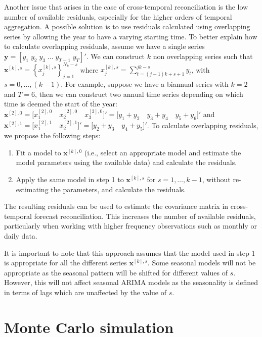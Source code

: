 \documentclass[12pt]{article}
\newcommand{\xvet}{\bm{x}}
\newcommand{\yvet}{\bm{y}}
\theoremstyle{definition}
\begin{document}
Another issue that arises in the case of cross-temporal reconciliation is the low number of available residuals, especially for the higher orders of temporal aggregation. A possible solution is to use residuals calculated using overlapping series by allowing the year to have a varying starting time. To better explain how to calculate overlapping residuals, assume we have a single series $\yvet = [y_1 \; y_2 \; y_3 \; \dots\; y_{T-1}\; y_{T}]'$. We can construct $k$ non overlapping series such that $\xvet^{[k], s} = \left\{x^{[k],s}_{j}\right\}_{j = 1}^{N_k-s}$ where $x^{[k],s}_{j} = \displaystyle\sum_{t = (j-1)k+s+1}^{jk-s} y_t$, with $s = 0, \dots, (k-1)$. For example, suppose we have a biannual series with $k = 2$ and $T = 6$, then we can construct two annual time series depending on which time is deemed the start of the year: $\xvet^{[2], 0} =  \Big[x_1^{[2], 0}\quad x_2^{[2], 0}\quad x_{3}^{[2], 0} \Big]' =\Big[y_1 + y_2\quad y_3 + y_4\quad y_5 + y_6\Big]'$ and $\xvet^{[2], 1} = \Big[x_1^{[2], 1}\quad x_2^{[2], 1} \Big]' = \Big[y_2 + y_3\quad  y_4 + y_5 \Big]'$. To calculate overlapping residuals, we propose the following steps:
\begin{enumerate}[nosep]
	\item Fit a model to $\xvet^{[k], 0}$ (i.e., select an appropriate model and estimate the model parameters using the available data) and calculate the residuals.
	\item Apply the same model in step 1 to $\xvet^{[k], s}$ for $s = 1, \dots, k-1$, without re-estimating the parameters, and calculate the residuals.
\end{enumerate}
The resulting residuals can be used to estimate the covariance matrix in cross-temporal forecast reconciliation. This increases the number of available residuals, particularly when working with higher frequency observations such as monthly or daily data.

It is important to note that this approach assumes that the model used in step 1 is appropriate for all the different series $\xvet^{[k], s}$. Some seasonal models will not be appropriate as the seasonal pattern will be shifted for different values of $s$. However, this will not affect seasonal ARIMA models as the seasonality is defined in terms of lags which are unaffected by the value of $s$.

\section{Monte Carlo simulation}\label{sec:mcsim}
\end{document}
